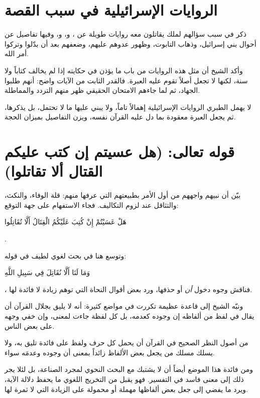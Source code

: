 \section{الروايات الإسرائيلية في سبب القصة}
ذكر  في سبب سؤالهم لملك يقاتلون معه روايات طويلة عن ، و، و، وفيها تفاصيل عن أحوال بني إسرائيل، وذهاب التابوت، وظهور عدوهم عليهم، وضعفهم بعد أن بدّلوا وتركوا أمر الله.

وأكد الشيخ أن مثل هذه الروايات من باب ما يؤذن في حكايته إذا لم يخالف كتاباً ولا سنة، لكنها لا تجعل أصلاً تقوم عليه العبرة. فالقدر الثابت من الآيات واضح: أنهم طلبوا الجهاد، ثم لما جاءهم الامتحان الحقيقي ظهر منهم التردد والمماطلة.

\begin{fawaid}
لا يهمل الطبري الروايات الإسرائيلية إهمالاً تاماً، ولا يبني عليها ما لا تحتمل، بل يذكرها، ثم يجعل العبرة معقودة بما دل عليه القرآن نفسه، ويزن التفاصيل بميزان الحجة.
\end{fawaid}

\section{قوله تعالى: (هل عسيتم إن كتب عليكم القتال ألا تقاتلوا)}
بيّن  أن نبيهم واجههم من أول الأمر بطبيعتهم التي عرفها منهم: قلة الوفاء، والنكث، والتثاقل عند لزوم التكاليف. فجاء الاستفهام على جهة التوقع: \begin{ayah}هَلْ عَسَيْتُمْ إِنْ كُتِبَ عَلَيْكُمُ الْقِتَالُ أَلَّا تُقَاتِلُوا\end{ayah}.

وتوسع  هنا في بحث لغوي لطيف في قوله: \begin{ayah}وَمَا لَنَا أَلَّا نُقَاتِلَ فِي سَبِيلِ اللَّهِ\end{ayah}، فناقش وجوه دخول \textit{أن} أو حذفها، ورد بعض أقوال النحاة التي توهم زيادة لا فائدة لها.

ونبّه الشيخ إلى قاعدة عظيمة تكررت في مواضع كثيرة: أنه لا يليق بجلال القرآن أن يقال في لفظ من ألفاظه إن وجوده كعدمه، بل كل لفظة جاءت لمعنى، وإن خفي وجهه على بعض الناس.

\begin{fawaid}
من أصول النظر الصحيح في القرآن أن يحمل كل حرف ولفظ على فائدة تليق به، ولا يسلك مسلك من يجعل بعض الألفاظ زائداً بمعنى أن وجوده وعدمَه سواء.
\end{fawaid}

ومن فائدة هذا الموضع أيضاً أن  لا يشتبك مع البحث النحوي لمجرد الصناعة، بل لئلا يجر ذلك إلى معنى فاسد في التفسير. فهو يقبل من التخريج اللغوي ما يحفظ دلالة الآية، ويرد ما يفضي إلى جعل بعض ألفاظها مهملة أو محمولة على الزيادة التي لا ثمرة لها.

